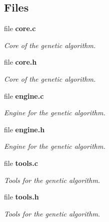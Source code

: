 \subsection*{Files}
\begin{DoxyCompactItemize}
\item 
file \textbf{ core.\+c}
\begin{DoxyCompactList}\small\item\em Core of the genetic algorithm. \end{DoxyCompactList}\item 
file \textbf{ core.\+h}
\begin{DoxyCompactList}\small\item\em Core of the genetic algorithm. \end{DoxyCompactList}\item 
file \textbf{ engine.\+c}
\begin{DoxyCompactList}\small\item\em Engine for the genetic algorithm. \end{DoxyCompactList}\item 
file \textbf{ engine.\+h}
\begin{DoxyCompactList}\small\item\em Engine for the genetic algorithm. \end{DoxyCompactList}\item 
file \textbf{ tools.\+c}
\begin{DoxyCompactList}\small\item\em Tools for the genetic algorithm. \end{DoxyCompactList}\item 
file \textbf{ tools.\+h}
\begin{DoxyCompactList}\small\item\em Tools for the genetic algorithm. \end{DoxyCompactList}\end{DoxyCompactItemize}
